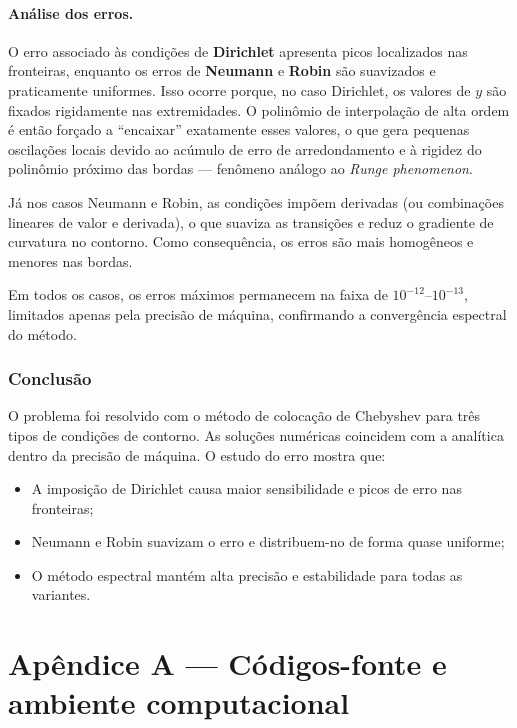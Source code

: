 \documentclass[12pt,a4paper]{article}
\begin{document}


\paragraph{Análise dos erros.}
O erro associado às condições de \textbf{Dirichlet} apresenta picos localizados nas fronteiras, enquanto os erros de \textbf{Neumann} e \textbf{Robin} são suavizados e praticamente uniformes.  
Isso ocorre porque, no caso Dirichlet, os valores de \(y\) são fixados rigidamente nas extremidades.  
O polinômio de interpolação de alta ordem é então forçado a “encaixar” exatamente esses valores, o que gera pequenas oscilações locais devido ao acúmulo de erro de arredondamento e à rigidez do polinômio próximo das bordas — fenômeno análogo ao \textit{Runge phenomenon}.  

Já nos casos Neumann e Robin, as condições impõem derivadas (ou combinações lineares de valor e derivada), o que suaviza as transições e reduz o gradiente de curvatura no contorno.  
Como consequência, os erros são mais homogêneos e menores nas bordas.

Em todos os casos, os erros máximos permanecem na faixa de \(10^{-12}\)–\(10^{-13}\), limitados apenas pela precisão de máquina, confirmando a convergência espectral do método.

\subsubsection{Conclusão}
O problema foi resolvido com o método de colocação de Chebyshev para três tipos de condições de contorno.  
As soluções numéricas coincidem com a analítica dentro da precisão de máquina.  
O estudo do erro mostra que:
\begin{itemize}
  \item A imposição de Dirichlet causa maior sensibilidade e picos de erro nas fronteiras;
  \item Neumann e Robin suavizam o erro e distribuem-no de forma quase uniforme;
  \item O método espectral mantém alta precisão e estabilidade para todas as variantes.
\end{itemize}

\newpage

\appendix
\section{Apêndice A — Códigos-fonte e ambiente computacional}
\end{document}
